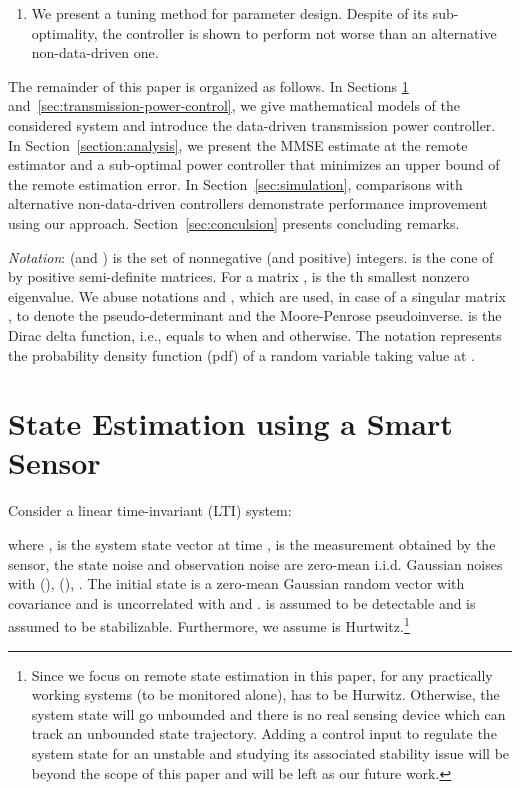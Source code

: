 \documentclass[twocolumn]{autart}    \usepackage{cite}
\begin{document}
{\begin{enumerate}
\item {We present a tuning method for parameter design.
Despite of its sub-optimality, the controller is shown to perform
{not worse} than an
alternative non-data-driven one.}
\vspace{-3mm}
\end{enumerate}
The remainder of this paper is organized
as follows. In
Sections \ref{sec:problem-setup} and~\ref{sec:transmission-power-control}, we give mathematical
models of the considered system and introduce the data-driven transmission power controller. In Section~\ref{section:analysis}, we
present the MMSE estimate at the remote estimator and
{a sub-optimal power controller that minimizes an upper bound of the remote
estimation error}. In Section~\ref{sec:simulation}, comparisons with
alternative non-data-driven controllers demonstrate performance
improvement using our approach. Section~\ref{sec:conculsion} presents concluding remarks.

\textit{Notation}:  (and ) is the set of nonnegative
(and positive) integers. 
is the cone of  by  positive semi-definite
matrices. For a matrix ,  is the th
smallest nonzero eigenvalue. We abuse
notations  and , which are used, in case of a singular matrix , to denote the pseudo-determinant and
the Moore-Penrose pseudoinverse.
 is the Dirac delta function, i.e.,  equals to  when  and  otherwise. The notation 
represents the probability density function (pdf) of a random variable  taking value at .

\section{State Estimation using a Smart Sensor} \label{sec:problem-setup}
Consider a linear time-invariant (LTI) system:

where  ,  is the system state vector at time ,  is the measurement obtained by the sensor, the state noise  and observation noise  are zero-mean i.i.d. Gaussian noises with  (),  (), . The initial state  is a zero-mean Gaussian random vector with covariance  and is uncorrelated with  and .  is assumed to be detectable and  is assumed to be stabilizable. Furthermore, we assume  is Hurtwitz.\footnote{{Since we focus on remote state estimation in this paper, for any practically working systems (to be monitored alone),  has to be Hurwitz. Otherwise, the system state will go unbounded and there is no real sensing device which can track an unbounded state trajectory. Adding a control input to regulate the system state for an unstable  and studying its associated stability issue will be beyond the scope of this paper and will be left as our future work.}}

}
\end{document}

